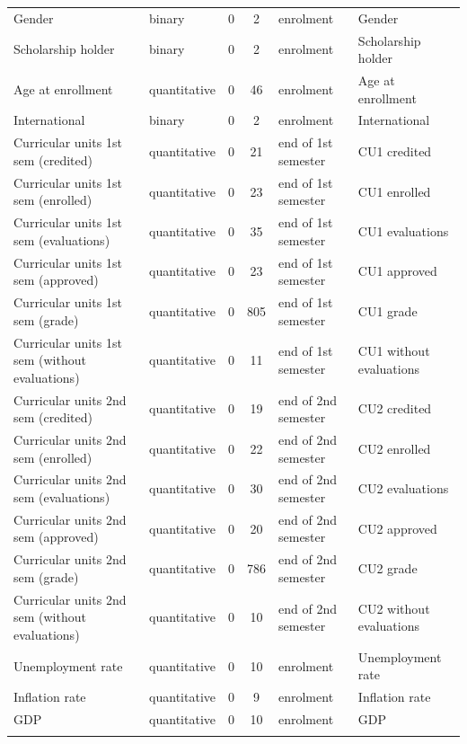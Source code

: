 \begin{table}[!htbp]
\begin{tabular*}{\textwidth}{@{\extracolsep\fill}@{}llccll@{}}
Gender & binary & 0 & 2 & enrolment & Gender \\
Scholarship holder & binary & 0 & 2 & enrolment & Scholarship holder \\
Age at enrollment & quantitative & 0 & 46 & enrolment & Age at enrollment \\
International & binary & 0 & 2 & enrolment & International \\
Curricular units 1st sem (credited) & quantitative & 0 & 21 & end of 1st semester & CU1 credited \\
Curricular units 1st sem (enrolled) & quantitative & 0 & 23 & end of 1st semester & CU1 enrolled \\
Curricular units 1st sem (evaluations) & quantitative & 0 & 35 & end of 1st semester & CU1 evaluations \\
Curricular units 1st sem (approved) & quantitative & 0 & 23 & end of 1st semester & CU1 approved \\
Curricular units 1st sem (grade) & quantitative & 0 & 805 & end of 1st semester & CU1 grade \\
Curricular units 1st sem (without evaluations) & quantitative & 0 & 11 & end of 1st semester & CU1 without evaluations \\
Curricular units 2nd sem (credited) & quantitative & 0 & 19 & end of 2nd semester & CU2 credited \\
Curricular units 2nd sem (enrolled) & quantitative & 0 & 22 & end of 2nd semester & CU2 enrolled \\
Curricular units 2nd sem (evaluations) & quantitative & 0 & 30 & end of 2nd semester & CU2 evaluations \\
Curricular units 2nd sem (approved) & quantitative & 0 & 20 & end of 2nd semester & CU2 approved \\
Curricular units 2nd sem (grade) & quantitative & 0 & 786 & end of 2nd semester & CU2 grade \\
Curricular units 2nd sem (without evaluations) & quantitative & 0 & 10 & end of 2nd semester & CU2 without evaluations \\
Unemployment rate & quantitative & 0 & 10 & enrolment & Unemployment rate \\
Inflation rate & quantitative & 0 & 9 & enrolment & Inflation rate \\
GDP & quantitative & 0 & 10 & enrolment & GDP \\
\botrule
\end{tabular*}
\end{table}

